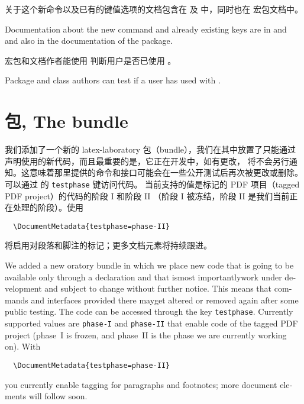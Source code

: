 \documentclass{ltnews}
\providecommand\Dash {\unskip \textemdash}
\begin{document}
关于这个新命令以及已有的键值选项的文档包含在  及
 中，同时也在 
宏包文档中。

\begin{english}
Documentation about the new command and
already existing keys are in  and 
and also in the documentation of the  package.
\end{english}

宏包和文档作者能使用  判断用户是否已使用 。

\begin{english}
Package and class authors can test if a user has used 
with .
\end{english}


\section{ 包, The  bundle}

我们添加了一个新的 latex-laboratory 包（bundle），我们在其中放置了只能通过
 声明使用的新代码，而且最重要的是，它正在开发中，如有更改，
将不会另行通知。这意味着那里提供的命令和接口可能会在一些公开测试后再次被更改或删除。 
可以通过  的 \texttt{testphase} 键访问代码。
当前支持的值是标记的 PDF 项目（tagged PDF project）的代码的阶段 I 和阶段 II
（阶段 I 被冻结，阶段 II 是我们当前正在处理的阶段）。使用
\begin{verbatim}
  \DocumentMetadata{testphase=phase-II}
\end{verbatim}
将启用对段落和脚注的标记；更多文档元素将持续跟进。

\begin{english}
We added a new oratory bundle in which we place new
code that is going to be available only through a
 declaration and that is\Dash most
importantly\Dash work under development and subject to
change without further notice. This means that commands and interfaces 
provided there mayget altered or removed again after some public testing.
The code can be accessed through the  key \texttt{testphase}.
Currently supported values are \texttt{phase-I} and \texttt{phase-II}
that enable code of the tagged PDF project (phase~I is frozen, and
phase~II is the phase we are currently working on).  With
\begin{verbatim}
  \DocumentMetadata{testphase=phase-II}
\end{verbatim}
you currently enable tagging for paragraphs and footnotes; more
document elements will follow soon.
\end{english}
\end{document}
